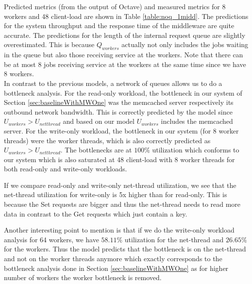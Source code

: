 Predicted metrics (from the output of Octave) and measured metrics for 8 workers and 48 client-load are shown in Table \ref{table:noq_1midd}. 
The predictions for the system throughput and the response time of the middleware are quite accurate. The predictions for the length of the internal request queue are slightly overestimated. This is because $Q_{workers}$ actually not only includes the jobs waiting in the queue but also those receiving service at the workers. Note that there can be at most 8 jobs receiving service at the workers at the same time since we have 8 workers. \\
In contrast to the previous models, a network of queues allows us to do a bottleneck analysis. For the read-only workload, the bottleneck in our system of Section \ref{sec:baselineWithMWOne} was the memcached server respectively its outbound network bandwidth. This is correctly predicted by the model since $U_{workers} > U_{netthread}$ and based on our model $U_{workers}$ includes the memcached server. For the write-only workload, the bottleneck in our system (for 8 worker threads) were the worker threads, which is also correctly predicted as $U_{workers} > U_{netthread}$. The bottlenecks are at $100\%$ utilization which conforms to our system which is also saturated at 48 client-load with 8 worker threads for both read-only and write-only workloads.

If we compare read-only and write-only net-thread utilization, we see that the net-thread utilization for write-only is 5x higher than for read-only. This is because the Set requests are bigger and thus the net-thread needs to read more data in contrast to the Get requests which just contain a key. 

Another interesting point to mention is that if we do the write-only workload analysis for 64 workers, we have $58.11\%$ utilization for the net-thread and $26.65\%$ for the workers. Thus the model predicts that the bottleneck is on the net-thread and not on the worker threads anymore which exactly corresponds to the bottleneck analysis done in Section \ref{sec:baselineWithMWOne} as for higher number of workers the worker bottleneck is removed.


